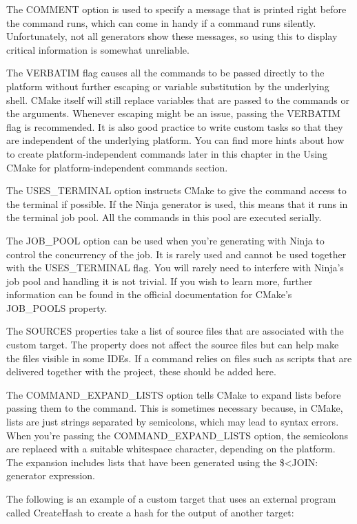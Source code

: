 The COMMENT option is used to specify a message that is printed right before the command runs, which can come in handy if a command runs silently. Unfortunately, not all generators show these messages, so using this to display critical information is somewhat unreliable.

The VERBATIM flag causes all the commands to be passed directly to the platform without further escaping or variable substitution by the underlying shell. CMake itself will still replace variables that are passed to the commands or the arguments. Whenever escaping might be an issue, passing the VERBATIM flag is recommended. It is also good practice to write custom tasks so that they are independent of the underlying platform. You can find more hints about how to create platform-independent commands later in this chapter in the Using CMake for platform-independent commands section.

The USES\_TERMINAL option instructs CMake to give the command access to the terminal if possible. If the Ninja generator is used, this means that it runs in the terminal job pool. All the commands in this pool are executed serially.

The JOB\_POOL option can be used when you're generating with Ninja to control the concurrency of the job. It is rarely used and cannot be used together with the USES\_TERMINAL flag. You will rarely need to interfere with Ninja's job pool and handling it is not trivial. If you wish to learn more, further information can be found in the official documentation for CMake's JOB\_POOLS property.

The SOURCES properties take a list of source files that are associated with the custom target. The property does not affect the source files but can help make the files visible in some IDEs. If a command relies on files such as scripts that are delivered together with the project, these should be added here.

The COMMAND\_EXPAND\_LISTS option tells CMake to expand lists before passing them to the command. This is sometimes necessary because, in CMake, lists are just strings separated by semicolons, which may lead to syntax errors. When you're passing the COMMAND\_EXPAND\_LISTS option, the semicolons are replaced with a suitable whitespace character, depending on the platform. The expansion includes lists that have been generated using the \$<JOIN: generator expression.

The following is an example of a custom target that uses an external program called CreateHash to create a hash for the output of another target:

